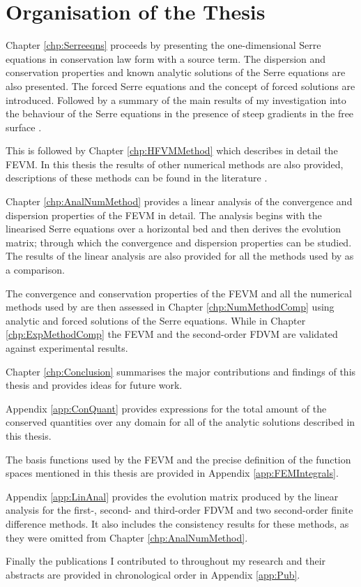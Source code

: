  
\newpage

\section{Organisation of the Thesis}
Chapter \ref{chp:Serreeqns} proceeds by presenting the one-dimensional Serre equations in conservation law form with a source term. The dispersion and conservation properties and known analytic solutions of the Serre equations are also presented. The forced Serre equations and the concept of forced solutions are introduced. Followed by a summary of the main results of my investigation into the behaviour of the Serre equations in the presence of steep gradients in the free surface \cite{Pitt-2018-61}.

This is followed by Chapter \ref{chp:HFVMMethod} which describes in detail the FEVM. In this thesis the results of other numerical methods are also provided, descriptions of these methods can be found in the literature \cite{Zoppou-etal-2017,Pitt-2018-61}. 

Chapter \ref{chp:AnalNumMethod} provides a linear analysis of the convergence and dispersion properties of the FEVM in detail. The analysis begins with the linearised Serre equations over a horizontal bed and then derives the evolution matrix; through which the convergence and dispersion properties can be studied. The results of the linear analysis are also provided for all the methods used by \citet{Pitt-2018-61} as a comparison.

The convergence and conservation properties of the FEVM and all the numerical methods used by \citet{Pitt-2018-61} are then assessed in Chapter \ref{chp:NumMethodComp} using analytic and forced solutions of the Serre equations. While in Chapter \ref{chp:ExpMethodComp} the FEVM and the second-order FDVM are validated against experimental results.

Chapter \ref{chp:Conclusion} summarises the major contributions and findings of this thesis and provides ideas for future work.

Appendix \ref{app:ConQuant} provides expressions for the total amount of the conserved quantities over any domain for all of the analytic solutions described in this thesis. 

The basis functions used by the FEVM and the precise definition of the function spaces mentioned in this thesis are provided in Appendix \ref{app:FEMIntegrals}. 

Appendix \ref{app:LinAnal} provides the evolution matrix produced by the linear analysis for the first-, second- and third-order FDVM and two second-order finite difference methods. It also includes the consistency results for these methods, as they were omitted from Chapter \ref{chp:AnalNumMethod}.

Finally the publications I contributed to throughout my research and their abstracts are provided in chronological order in Appendix \ref{app:Pub}. 